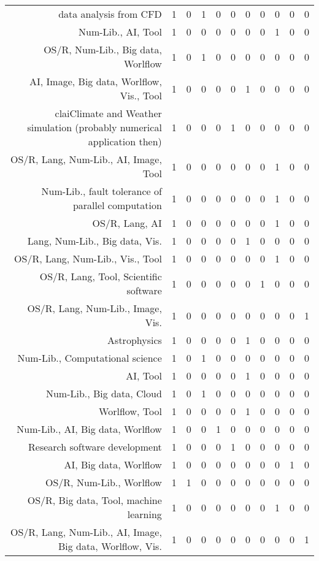 {\begin{landscape}
\begin{longtable}[htb]{r|c|c|c|c|c|c|c|c|c|c}
{data analysis from CFD} & 1 & 0 & 1 & 0 & 0 & 0 & 0 & 0 & 0 & 0 \\%
{Num-Lib., AI, Tool} & 1 & 0 & 0 & 0 & 0 & 0 & 0 & 1 & 0 & 0 \\%
{OS/R, Num-Lib., Big data, Worlflow} & 1 & 0 & 1 & 0 & 0 & 0 & 0 & 0 & 0 & 0 \\%
{AI, Image, Big data, Worlflow, Vis., Tool} & 1 & 0 & 0 & 0 & 0 & 1 & 0 & 0 & 0 & 0 \\%
{claiClimate and Weather simulation (probably numerical application then)} & 1 & 0 & 0 & 0 & 1 & 0 & 0 & 0 & 0 & 0 \\%
{OS/R, Lang, Num-Lib., AI, Image, Tool} & 1 & 0 & 0 & 0 & 0 & 0 & 0 & 1 & 0 & 0 \\%
{Num-Lib., fault tolerance of parallel computation} & 1 & 0 & 0 & 0 & 0 & 0 & 0 & 1 & 0 & 0 \\%
{OS/R, Lang, AI} & 1 & 0 & 0 & 0 & 0 & 0 & 0 & 1 & 0 & 0 \\%
{Lang, Num-Lib., Big data, Vis.} & 1 & 0 & 0 & 0 & 0 & 1 & 0 & 0 & 0 & 0 \\%
{OS/R, Lang, Num-Lib., Vis., Tool} & 1 & 0 & 0 & 0 & 0 & 0 & 0 & 1 & 0 & 0 \\%
{OS/R, Lang, Tool, Scientific software} & 1 & 0 & 0 & 0 & 0 & 0 & 1 & 0 & 0 & 0 \\%
{OS/R, Lang, Num-Lib., Image, Vis.} & 1 & 0 & 0 & 0 & 0 & 0 & 0 & 0 & 0 & 1 \\%
{Astrophysics} & 1 & 0 & 0 & 0 & 0 & 1 & 0 & 0 & 0 & 0 \\%
{Num-Lib., Computational science} & 1 & 0 & 1 & 0 & 0 & 0 & 0 & 0 & 0 & 0 \\%
{AI, Tool} & 1 & 0 & 0 & 0 & 0 & 1 & 0 & 0 & 0 & 0 \\%
{Num-Lib., Big data, Cloud} & 1 & 0 & 1 & 0 & 0 & 0 & 0 & 0 & 0 & 0 \\%
{Worlflow, Tool} & 1 & 0 & 0 & 0 & 0 & 1 & 0 & 0 & 0 & 0 \\%
{Num-Lib., AI, Big data, Worlflow} & 1 & 0 & 0 & 1 & 0 & 0 & 0 & 0 & 0 & 0 \\%
{Research software development} & 1 & 0 & 0 & 0 & 1 & 0 & 0 & 0 & 0 & 0 \\%
{AI, Big data, Worlflow} & 1 & 0 & 0 & 0 & 0 & 0 & 0 & 0 & 1 & 0 \\%
{OS/R, Num-Lib., Worlflow} & 1 & 1 & 0 & 0 & 0 & 0 & 0 & 0 & 0 & 0 \\%
{OS/R, Big data, Tool, machine learning} & 1 & 0 & 0 & 0 & 0 & 0 & 0 & 1 & 0 & 0 \\%
{OS/R, Lang, Num-Lib., AI, Image, Big data, Worlflow, Vis.} & 1 & 0 & 0 & 0 & 0 & 0 & 0 & 0 & 0 & 1 \\%

\end{longtable}
\end{landscape}}
